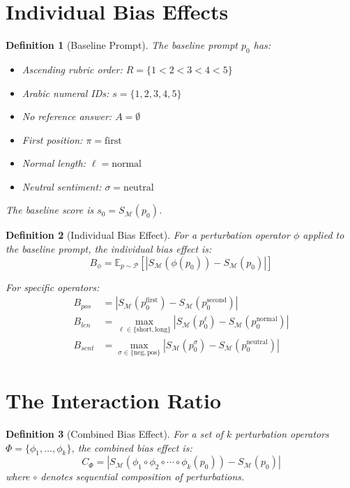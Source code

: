 \documentclass[11pt]{article}
\newtheorem{definition}{Definition}
\begin{document}
\section{Individual Bias Effects}

\begin{definition}[Baseline Prompt]
The baseline prompt $p_0$ has:
\begin{itemize}
    \item Ascending rubric order: $R = \{1 < 2 < 3 < 4 < 5\}$
    \item Arabic numeral IDs: $s = \{1,2,3,4,5\}$
    \item No reference answer: $A = \emptyset$
    \item First position: $\pi = \text{first}$
    \item Normal length: $\ell = \text{normal}$
    \item Neutral sentiment: $\sigma = \text{neutral}$
\end{itemize}
The baseline score is $s_0 = S_\mathcal{M}(p_0)$.
\end{definition}

\begin{definition}[Individual Bias Effect]
For a perturbation operator $\phi$ applied to the baseline prompt, the individual bias effect is:
\begin{equation}
B_\phi = \mathbb{E}_{p \sim \mathcal{P}} \left[ \left| S_\mathcal{M}(\phi(p_0)) - S_\mathcal{M}(p_0) \right| \right]
\end{equation}

For specific operators:
\begin{align}
B_{pos} &= \left| S_\mathcal{M}(p_0^{\text{first}}) - S_\mathcal{M}(p_0^{\text{second}}) \right| \\
B_{len} &= \max_{\ell \in \{\text{short},\text{long}\}} \left| S_\mathcal{M}(p_0^\ell) - S_\mathcal{M}(p_0^{\text{normal}}) \right| \\
B_{sent} &= \max_{\sigma \in \{\text{neg},\text{pos}\}} \left| S_\mathcal{M}(p_0^\sigma) - S_\mathcal{M}(p_0^{\text{neutral}}) \right|
\end{align}
\end{definition}

\section{The Interaction Ratio}

\begin{definition}[Combined Bias Effect]
For a set of $k$ perturbation operators $\Phi = \{\phi_1, \dots, \phi_k\}$, the combined bias effect is:
\begin{equation}
C_\Phi = \left| S_\mathcal{M}(\phi_1 \circ \phi_2 \circ \cdots \circ \phi_k(p_0)) - S_\mathcal{M}(p_0) \right|
\end{equation}
where $\circ$ denotes sequential composition of perturbations.
\end{definition}
\end{document}
